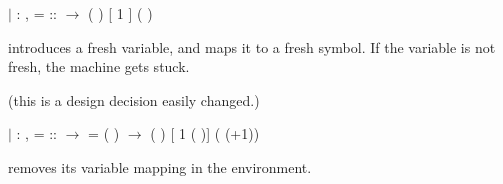 \documentclass[12pt]{report}
\begin{document}
       
\begin{coqdoccode}
\coqdocindent{3.00em}
\ensuremath{|}  : \coqdockw{\ensuremath{\forall}}       ,\coqdoceol
\coqdocindent{5.00em}
 =  ::  \ensuremath{\rightarrow}\coqdoceol
\coqdocindent{5.00em}
\coqdoceol
\coqdocindent{6.00em}
(       ) [ 1 ]\coqdoceol
\coqdocindent{6.00em}
(      )\coqdoceol
\coqdocnoindent
\coqdoceol
\coqdocindent{3.00em}
\end{coqdoccode}
 introduces a fresh variable, and maps
          it to a fresh symbol. If the variable is not
          fresh, the machine gets stuck.


          (this is a design decision easily changed.)


      
\begin{coqdoccode}
\coqdocindent{3.00em}
\ensuremath{|}  : \coqdockw{\ensuremath{\forall}}         ,\coqdoceol
\coqdocindent{5.00em}
 =   ::  \ensuremath{\rightarrow}\coqdoceol
\coqdocindent{5.00em}
 =   ( )  \ensuremath{\rightarrow}\coqdoceol
\coqdocindent{5.00em}
 \coqdoceol
\coqdocindent{6.00em}
(            ) [ 1 ( )]\coqdoceol
\coqdocindent{6.00em}
(      (+1))\coqdoceol
\coqdocnoindent
\coqdoceol
\coqdocindent{3.00em}
\end{coqdoccode}
 removes its variable mapping in the environment.
\end{document}
